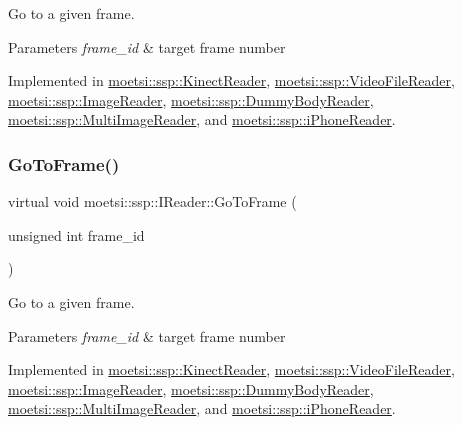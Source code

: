 Go to a given frame. 


\begin{DoxyParams}{Parameters}
{\em frame\+\_\+id} & target frame number \\
\hline
\end{DoxyParams}


Implemented in \hyperlink{classmoetsi_1_1ssp_1_1KinectReader_a315690c46e153a35d4ded1189e93af08}{moetsi\+::ssp\+::\+Kinect\+Reader}, \hyperlink{classmoetsi_1_1ssp_1_1VideoFileReader_ad98a532db8b1e2c3879df274b2efb082}{moetsi\+::ssp\+::\+Video\+File\+Reader}, \hyperlink{classmoetsi_1_1ssp_1_1ImageReader_a32eb88cc612e6920f4910e0803b0ce3c}{moetsi\+::ssp\+::\+Image\+Reader}, \hyperlink{classmoetsi_1_1ssp_1_1DummyBodyReader_a61e495deb7314560d5e17388f6b6938f}{moetsi\+::ssp\+::\+Dummy\+Body\+Reader}, \hyperlink{classmoetsi_1_1ssp_1_1MultiImageReader_a7c552a1ad469660ea0a88b9ca85138ad}{moetsi\+::ssp\+::\+Multi\+Image\+Reader}, and \hyperlink{classmoetsi_1_1ssp_1_1iPhoneReader_a27b6dea97e4c4db8e4e749cc9e30e7ca}{moetsi\+::ssp\+::i\+Phone\+Reader}.

\mbox{\label{classmoetsi_1_1ssp_1_1IReader_a6f1be3c06538992cca6d550bd9566681}} 
\subsubsection{\texorpdfstring{Go\+To\+Frame()}{GoToFrame()}\hspace{0.1cm}{\footnotesize\ttfamily [2/2]}}
{\footnotesize\ttfamily virtual void moetsi\+::ssp\+::\+I\+Reader\+::\+Go\+To\+Frame (\begin{DoxyParamCaption}\item[{unsigned int}]{frame\+\_\+id }\end{DoxyParamCaption})\hspace{0.3cm}{\ttfamily [pure virtual]}}



Go to a given frame. 


\begin{DoxyParams}{Parameters}
{\em frame\+\_\+id} & target frame number \\
\hline
\end{DoxyParams}


Implemented in \hyperlink{classmoetsi_1_1ssp_1_1KinectReader_a315690c46e153a35d4ded1189e93af08}{moetsi\+::ssp\+::\+Kinect\+Reader}, \hyperlink{classmoetsi_1_1ssp_1_1VideoFileReader_ad98a532db8b1e2c3879df274b2efb082}{moetsi\+::ssp\+::\+Video\+File\+Reader}, \hyperlink{classmoetsi_1_1ssp_1_1ImageReader_a32eb88cc612e6920f4910e0803b0ce3c}{moetsi\+::ssp\+::\+Image\+Reader}, \hyperlink{classmoetsi_1_1ssp_1_1DummyBodyReader_a61e495deb7314560d5e17388f6b6938f}{moetsi\+::ssp\+::\+Dummy\+Body\+Reader}, \hyperlink{classmoetsi_1_1ssp_1_1MultiImageReader_a7c552a1ad469660ea0a88b9ca85138ad}{moetsi\+::ssp\+::\+Multi\+Image\+Reader}, and \hyperlink{classmoetsi_1_1ssp_1_1iPhoneReader_a27b6dea97e4c4db8e4e749cc9e30e7ca}{moetsi\+::ssp\+::i\+Phone\+Reader}.

